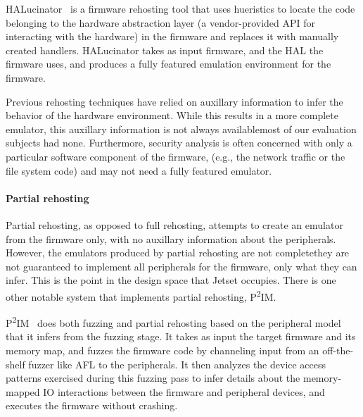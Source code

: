 HALucinator~\cite{clementshalucinator} is a firmware rehosting tool that uses hueristics to locate the code belonging to the hardware abstraction layer (a vendor-provided API for interacting with the hardware) in the firmware and replaces it with manually created handlers. 
HALucinator takes as input firmware, and the HAL the firmware uses, and produces a fully featured emulation environment for the firmware.


Previous rehosting techniques have relied on auxillary information to infer the behavior of the hardware environment.
While this results in a more complete emulator, this auxillary information is not always available\textemdash most of our evaluation subjects had none.
Furthermore, security analysis is often concerned with only a particular software component of the firmware, (e.g., the network traffic or the file system code) and may not need a fully featured emulator.

\paragraph{Partial rehosting}
Partial rehosting, as opposed to full rehosting, attempts to create an emulator from the firmware only, with no auxillary information about the peripherals.
However, the emulators produced by partial rehosting are not complete\textemdash they are not guaranteed to implement all peripherals for the firmware, only what they can infer.
This is the point in the design space that Jetset occupies.
There is one other notable system that implements partial rehosting, P\textsuperscript{2}IM.

P\textsuperscript{2}IM~\cite{p2im2020} does both fuzzing and partial rehosting based on the peripheral model that it infers from the fuzzing stage.
It takes as input the target firmware and its memory map, and fuzzes the firmware code by channeling input from an off-the-shelf fuzzer like AFL to the peripherals. 
It then analyzes the device access patterns exercised during this fuzzing pass to infer details about the memory-mapped IO interactions between the firmware and peripheral devices, and executes the firmware without crashing.

